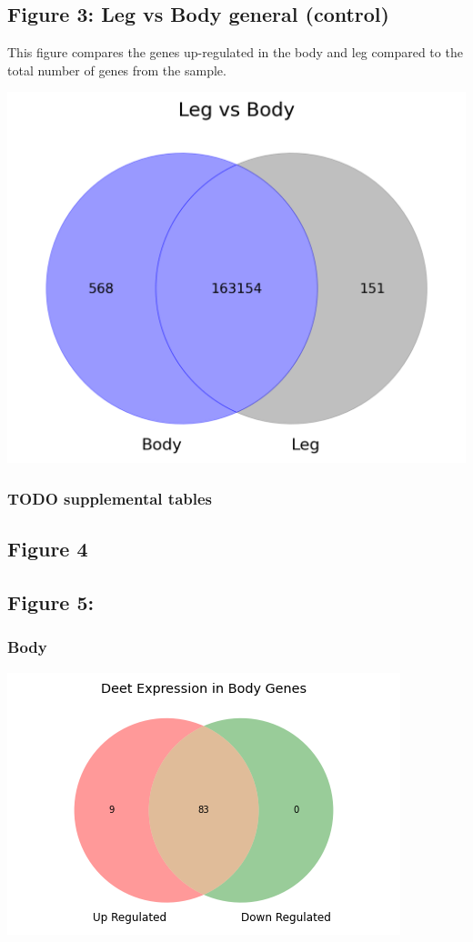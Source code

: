 \documentclass[11pt]{article}
\begin{document}
\subsection{Figure 3: Leg vs Body general (control)}
\label{sec:orgce9bf6f}
This figure compares the genes up-regulated in the body and leg compared to the total number of genes from the sample.
\begin{center}
\includegraphics[width=.9\linewidth]{figure3/Deseq-BodyvsLeg.png}
\end{center}
\subsubsection{{\bfseries\sffamily TODO} supplemental tables}
\label{sec:orge417252}
\subsection{Figure 4}
\label{sec:org61576e7}
\subsection{Figure 5:}
\label{sec:orga7443f6}
\subsubsection{Body}
\label{sec:org80b8500}
\begin{center}
\includegraphics[width=.9\linewidth]{figure5/DeetBodyDeseq.png}
\end{center}
\end{document}
